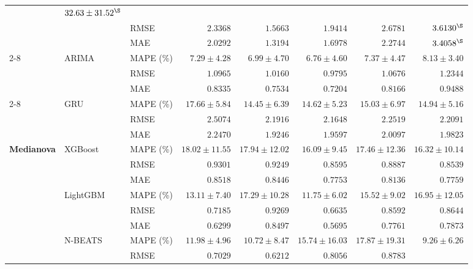 \begin{table}[!p]
\begin{tabular}{ll l rrrr || r}
      & $32.63 \pm 31.52^{\S}$ \\
  & & RMSE
      & $2.3368$ & $\mathbf{1.5663}$ & $1.9414$ & $2.6781$
      & $3.6130^{\S}$ \\
  & & MAE
      & $2.0292$ & $\mathbf{1.3194}$ & $1.6978$ & $2.2744$
      & $3.4058^{\S}$ \\
\cmidrule{2-8}
  & \multirow{3}{*}{ARIMA}
    & MAPE (\%)
      & $7.29 \pm 4.28$ & $6.99 \pm 4.70$ & $\mathbf{6.76 \pm 4.60}$ & $7.37 \pm 4.47$
      & $8.13 \pm 3.40$ \\
  & & RMSE
      & $1.0965$ & $1.0160$ & $\mathbf{0.9795}$ & $1.0676$
      & $1.2344$ \\
  & & MAE
      & $0.8335$ & $0.7534$ & $\mathbf{0.7204}$ & $0.8166$
      & $0.9488$ \\
\cmidrule{2-8}
  & \multirow{3}{*}{GRU}
    & MAPE (\%)
      & $17.66 \pm 5.84$ & $\mathbf{14.45 \pm 6.39}$ & $14.62 \pm 5.23$ & $15.03 \pm 6.97$
      & $14.94 \pm 5.16$ \\
  & & RMSE
      & $2.5074$ & $2.1916$ & $\mathbf{2.1648}$ & $2.2519$
      & $2.2091$ \\
  & & MAE
      & $2.2470$ & $\mathbf{1.9246}$ & $1.9597$ & $2.0097$
      & $1.9823$ \\
\midrule
\multirow{15}{*}{\textbf{Medianova}}
  & \multirow{3}{*}{XGBoost}
    & MAPE (\%)
      & $18.02 \pm 11.55$ & $17.94 \pm 12.02$ & $\mathbf{16.09 \pm 9.45}$ & $17.46 \pm 12.36$
      & $16.32 \pm 10.14$ \\
  & & RMSE
      & $0.9301$ & $0.9249$ & $0.8595$ & $0.8887$
      & $\mathbf{0.8539}$ \\
  & & MAE
      & $0.8518$ & $0.8446$ & $\mathbf{0.7753}$ & $0.8136$
      & $0.7759$ \\
\cmidrule{2-8}
  & \multirow{3}{*}{LightGBM}
    & MAPE (\%)
      & $13.11 \pm 7.40$ & $17.29 \pm 10.28$ & $\mathbf{11.75 \pm 6.02}$ & $15.52 \pm 9.02$
      & $16.95 \pm 12.05$ \\
  & & RMSE
      & $0.7185$ & $0.9269$ & $\mathbf{0.6635}$ & $0.8592$
      & $0.8644$ \\
  & & MAE
      & $0.6299$ & $0.8497$ & $\mathbf{0.5695}$ & $0.7761$
      & $0.7873$ \\
\cmidrule{2-8}
  & \multirow{3}{*}{N-BEATS}
    & MAPE (\%)
      & $11.98 \pm 4.96$ & $10.72 \pm 8.47$ & $15.74 \pm 16.03$ & $17.87 \pm 19.31$
      & $\mathbf{9.26 \pm 6.26}$ \\
  & & RMSE
      & $0.7029$ & $0.6212$ & $0.8056$ & $0.8783$

\end{tabular}
\end{table}
